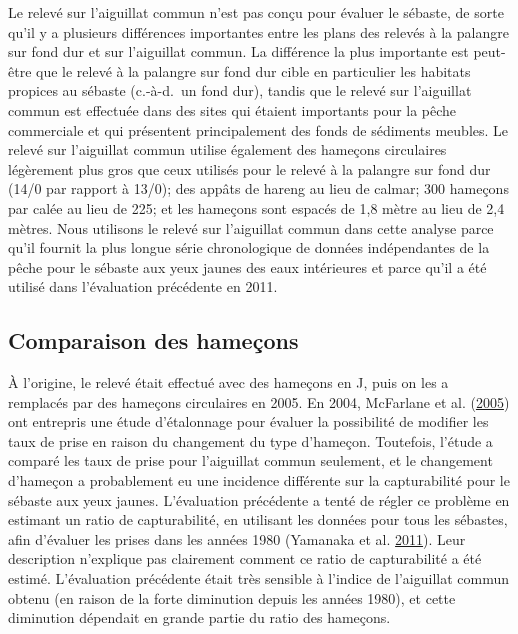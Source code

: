 \documentclass[11pt]{book}
\begin{document}
Le relevé sur l'aiguillat commun n'est pas conçu pour évaluer le sébaste, de sorte qu'il y a plusieurs différences importantes entre les plans des relevés à la palangre sur fond dur et sur l'aiguillat commun. La différence la plus importante est peut-être que le relevé à la palangre sur fond dur cible en particulier les habitats propices au sébaste (c.-à-d.~un fond dur), tandis que le relevé sur l'aiguillat commun est effectuée dans des sites qui étaient importants pour la pêche commerciale et qui présentent principalement des fonds de sédiments meubles. Le relevé sur l'aiguillat commun utilise également des hameçons circulaires légèrement plus gros que ceux utilisés pour le relevé à la palangre sur fond dur (14/0 par rapport à 13/0); des appâts de hareng au lieu de calmar; 300 hameçons par calée au lieu de 225; et les hameçons sont espacés de 1,8 mètre au lieu de 2,4 mètres. Nous utilisons le relevé sur l'aiguillat commun dans cette analyse parce qu'il fournit la plus longue série chronologique de données indépendantes de la pêche pour le sébaste aux yeux jaunes des eaux intérieures et parce qu'il a été utilisé dans l'évaluation précédente en 2011.

\hypertarget{sec:dog-hook-comparison}{%
\subsection{Comparaison des hameçons}\label{sec:dog-hook-comparison}}

À l'origine, le relevé était effectué avec des hameçons en J, puis on les a remplacés par des hameçons circulaires en 2005. En 2004, McFarlane et al. (\protect\hyperlink{ref-mcfarlane2005}{2005}) ont entrepris une étude d'étalonnage pour évaluer la possibilité de modifier les taux de prise en raison du changement du type d'hameçon. Toutefois, l'étude a comparé les taux de prise pour l'aiguillat commun seulement, et le changement d'hameçon a probablement eu une incidence différente sur la capturabilité pour le sébaste aux yeux jaunes. L'évaluation précédente a tenté de régler ce problème en estimant un ratio de capturabilité, en utilisant les données pour tous les sébastes, afin d'évaluer les prises dans les années 1980 (Yamanaka et al. \protect\hyperlink{ref-yamanaka2011}{2011}). Leur description n'explique pas clairement comment ce ratio de capturabilité a été estimé. L'évaluation précédente était très sensible à l'indice de l'aiguillat commun obtenu (en raison de la forte diminution depuis les années 1980), et cette diminution dépendait en grande partie du ratio des hameçons.
\end{document}
